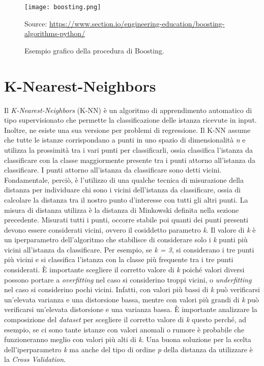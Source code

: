 \begin{figure}[h]
	\begin{center}
		\texttt{[image: boosting.png]}
		\caption{Esempio grafico della procedura di Boosting.
		} 
		Source: \url{https://www.section.io/engineering-education/boosting-algorithms-python/}\label{fig:boosting}
	\end{center}
\end{figure}

\section{K-Nearest-Neighbors}
Il \emph{K-Nearest-Neighbors} (K-NN) \autocite{dasarathy1991nearest} è un algoritmo di apprendimento automatico di tipo supervisionato che permette la classificazione delle istanza ricevute in input. Inoltre, ne esiste una sua versione per problemi di regressione. Il K-NN assume che tutte le istanze corrispondano a punti in uno spazio di dimensionalità \emph{n} e utilizza la prossimità tra i vari punti per classificarli, ossia classifica l'istanza da classificare con la classe maggiormente presente tra i punti attorno all'istanza da classificare. I punti attorno all'istanza da classificare sono detti vicini. Fondamentale, perciò, è l'utilizzo di una qualche tecnica di misurazione della distanza per individuare chi sono i vicini dell'istanza da classificare, ossia di calcolare la distanza tra il nostro punto d'interesse con tutti gli altri punti. La misura di distanza utilizza è la distanza di Minkowski definita nella sezione precedente. Misurati tutti i punti, occorre stabile poi quanti dei punti presenti devono essere considerati vicini, ovvero il cosiddetto parametro \emph{k}. Il valore di \emph{k} è un iperparametro dell'algoritmo che stabilisce di considerare solo i \emph{k} punti più vicini all'istanza da classificare. Per esempio, se \emph{k = 3}, si considerano i tre punti più vicini e si classifica l'istanza con la classe più frequente tra i tre punti considerati. È importante scegliere il corretto valore di \emph{k} poiché valori diversi possono portare a \emph{overfitting} nel caso si considerino troppi vicini, o \emph{underfitting} nel caso si considerino pochi vicini. Infatti, con valori più bassi di \emph{k} può verificarsi un'elevata varianza e una distorsione bassa, mentre con valori più grandi di \emph{k} può verificarsi un'elevata distorsione e una varianza bassa. È importante analizzare la composizione del \emph{dataset} per scegliere il corretto valore di \emph{k} questo perché, ad esempio, se ci sono tante istanze con valori anomali o rumore è probabile che funzioneranno meglio con valori più alti di \emph{k}. Una buona soluzione per la scelta dell'iperparametro \emph{k} ma anche del tipo di ordine \emph{p} della distanza da utilizzare è la \emph{Cross Validation}.\\
